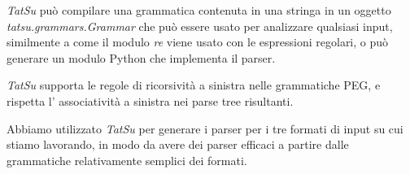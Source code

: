 \textit{TatSu} può compilare una grammatica contenuta in una stringa in un oggetto \textit{tatsu.grammars.Grammar} che può essere usato per analizzare qualsiasi input, similmente a come il modulo \textit{re} viene usato con le espressioni regolari, o può generare un modulo Python che implementa il parser.


\textit{TatSu} supporta le regole di ricorsività a sinistra nelle grammatiche PEG, e rispetta l' associatività a sinistra nei parse tree risultanti.

Abbiamo utilizzato \textit{TatSu} per generare i parser per i tre formati di input su cui stiamo lavorando, in modo da avere dei parser efficaci a partire dalle grammatiche relativamente semplici dei formati.